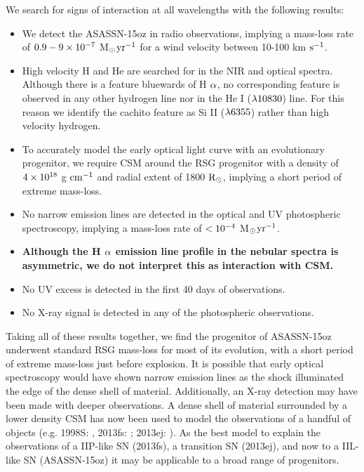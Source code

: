 \documentclass[a4paper,fleqn,usenatbib]{mnras}
\newcommand{\msunperiod}{M$\rm{_{\odot}}$}
\begin{document}
We search for signs of interaction at all wavelengths with the following results:
\begin{itemize}
\item We detect the ASASSN-15oz in radio observations, implying a mass-loss rate of $\rm{0.9-9\times10^{-7}}$ \msunperiod $\rm{yr^{-1}}$ for a wind velocity between 10-100 km $\rm{s^{-1}}$.
\item High velocity H and He are searched for in the NIR and optical spectra. 
Although there is a feature bluewards of H $\rm{\alpha}$, no corresponding feature is observed in any other hydrogen line nor in the He I ($\rm{\lambda 10830}$) line. 
For this reason we identify the cachito feature as Si II ($\rm{\lambda 6355}$) rather than high velocity hydrogen.
\item To accurately model the early optical light curve with an evolutionary progenitor, we require CSM around the RSG progenitor with a density of $\rm{4\times10^{18}}$ g $\rm{cm^{-1}}$ and radial extent of 1800 $\rm{R_{\odot}}$, implying a short period of extreme mass-loss.
\item No narrow emission lines are detected in the optical and UV photospheric spectroscopy, implying a mass-loss rate of $\rm{< 10^{-4}}$ \msunperiod $\rm{yr^{-1}}$.
\item \textbf{Although the H $\rm{\alpha}$ emission line profile in the nebular spectra is asymmetric, we do not interpret this as interaction with CSM.}
\item No UV excess is detected in the first 40 days of observations.
\item No X-ray signal is detected in any of the photospheric observations.
\end{itemize}
Taking all of these results together, we find the progenitor of ASASSN-15oz underwent standard RSG mass-loss for most of its evolution, with a short period of extreme mass-loss just before explosion. 
It is possible that early optical spectroscopy would have shown narrow emission lines as the shock illuminated the edge of the dense shell of material.
Additionally, an X-ray detection may have been made with deeper observations. 
A dense shell of material surrounded by a lower density CSM has now been used to model the observations of a handful of objects (e.g. 1998S: \citealt{2001chugai}, 2013fs: \citealt{2017yaron}; 2013ej: \citealt{2018morozova2}).
As the best model to explain the observations of a IIP-like SN (2013fs), a transition SN (2013ej), and now to a IIL-like SN (ASASSN-15oz) it may be applicable to a broad range of progenitors.
\end{document}
